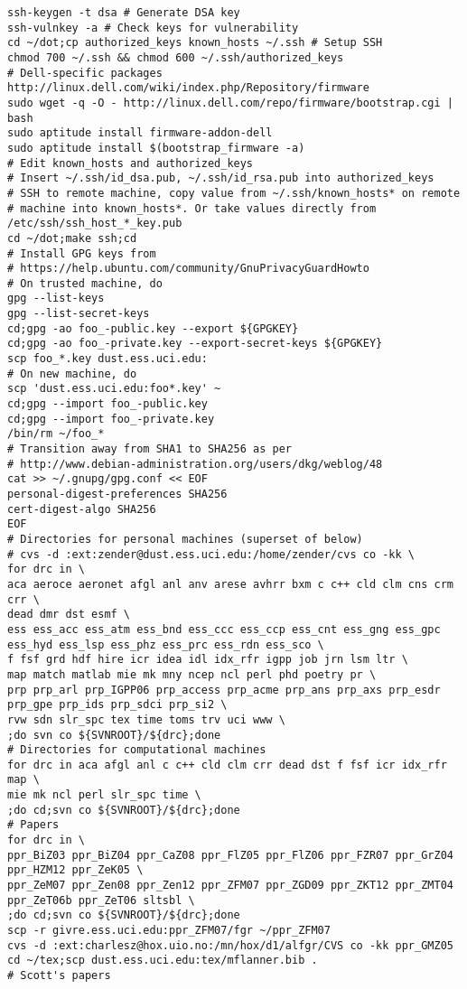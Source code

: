\documentclass[12pt,twoside]{article}
\begin{document}
\begin{verbatim}
ssh-keygen -t dsa # Generate DSA key
ssh-vulnkey -a # Check keys for vulnerability
cd ~/dot;cp authorized_keys known_hosts ~/.ssh # Setup SSH
chmod 700 ~/.ssh && chmod 600 ~/.ssh/authorized_keys
# Dell-specific packages http://linux.dell.com/wiki/index.php/Repository/firmware
sudo wget -q -O - http://linux.dell.com/repo/firmware/bootstrap.cgi | bash
sudo aptitude install firmware-addon-dell
sudo aptitude install $(bootstrap_firmware -a)
# Edit known_hosts and authorized_keys
# Insert ~/.ssh/id_dsa.pub, ~/.ssh/id_rsa.pub into authorized_keys
# SSH to remote machine, copy value from ~/.ssh/known_hosts* on remote
# machine into known_hosts*. Or take values directly from /etc/ssh/ssh_host_*_key.pub
cd ~/dot;make ssh;cd
# Install GPG keys from
# https://help.ubuntu.com/community/GnuPrivacyGuardHowto
# On trusted machine, do
gpg --list-keys
gpg --list-secret-keys
cd;gpg -ao foo_-public.key --export ${GPGKEY}
cd;gpg -ao foo_-private.key --export-secret-keys ${GPGKEY}
scp foo_*.key dust.ess.uci.edu:
# On new machine, do
scp 'dust.ess.uci.edu:foo*.key' ~
cd;gpg --import foo_-public.key
cd;gpg --import foo_-private.key
/bin/rm ~/foo_*
# Transition away from SHA1 to SHA256 as per
# http://www.debian-administration.org/users/dkg/weblog/48
cat >> ~/.gnupg/gpg.conf << EOF
personal-digest-preferences SHA256
cert-digest-algo SHA256
EOF
# Directories for personal machines (superset of below)
# cvs -d :ext:zender@dust.ess.uci.edu:/home/zender/cvs co -kk \
for drc in \
aca aeroce aeronet afgl anl anv arese avhrr bxm c c++ cld clm cns crm crr \
dead dmr dst esmf \
ess ess_acc ess_atm ess_bnd ess_ccc ess_ccp ess_cnt ess_gng ess_gpc ess_hyd ess_lsp ess_phz ess_prc ess_rdn ess_sco \
f fsf grd hdf hire icr idea idl idx_rfr igpp job jrn lsm ltr \
map match matlab mie mk mny ncep ncl perl phd poetry pr \
prp prp_arl prp_IGPP06 prp_access prp_acme prp_ans prp_axs prp_esdr prp_gpe prp_ids prp_sdci prp_si2 \
rvw sdn slr_spc tex time toms trv uci www \
;do svn co ${SVNROOT}/${drc};done
# Directories for computational machines
for drc in aca afgl anl c c++ cld clm crr dead dst f fsf icr idx_rfr map \
mie mk ncl perl slr_spc time \
;do cd;svn co ${SVNROOT}/${drc};done
# Papers
for drc in \
ppr_BiZ03 ppr_BiZ04 ppr_CaZ08 ppr_FlZ05 ppr_FlZ06 ppr_FZR07 ppr_GrZ04 ppr_HZM12 ppr_ZeK05 \
ppr_ZeM07 ppr_Zen08 ppr_Zen12 ppr_ZFM07 ppr_ZGD09 ppr_ZKT12 ppr_ZMT04 ppr_ZeT06b ppr_ZeT06 sltsbl \
;do cd;svn co ${SVNROOT}/${drc};done
scp -r givre.ess.uci.edu:ppr_ZFM07/fgr ~/ppr_ZFM07
cvs -d :ext:charlesz@hox.uio.no:/mn/hox/d1/alfgr/CVS co -kk ppr_GMZ05 
cd ~/tex;scp dust.ess.uci.edu:tex/mflanner.bib .
# Scott's papers

\end{verbatim}
\end{document}
